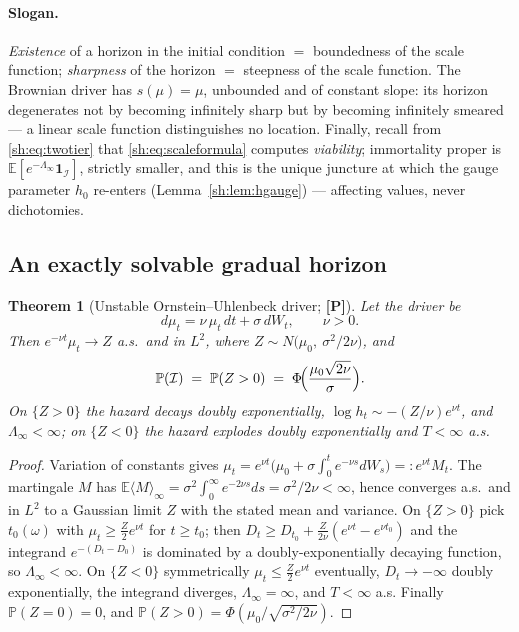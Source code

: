 \documentclass[11pt]{article}
\numberwithin{equation}{section}
\theoremstyle{plain}
\newtheorem{theorem}{Theorem}[section]
\theoremstyle{definition}
\theoremstyle{remark}
\newcommand{\E}{\mathbb{E}}
\newcommand{\PP}{\mathbb{P}}
\newcommand{\one}{\mathbf{1}}
\newcommand{\Imm}{\mathcal{I}}
\begin{document}
\paragraph{Slogan.}\label{sh:rem:slogan}
\emph{Existence} of a horizon in the initial condition
$=$ boundedness of the scale function;
\emph{sharpness} of the horizon $=$ steepness of the scale function.
The Brownian driver has $s(\mu)=\mu$, unbounded and of constant slope: its
horizon degenerates not by becoming infinitely sharp but by becoming
infinitely smeared --- a linear scale function distinguishes no location.
Finally, recall from \eqref{sh:eq:twotier} that
\eqref{sh:eq:scaleformula} computes \emph{viability}; immortality proper is
$\E[e^{-\Lambda_\infty}\one_\Imm]$, strictly smaller, and this is the
unique juncture at which the gauge parameter $h_0$ re-enters
(Lemma~\ref{sh:lem:hgauge}) --- affecting values, never dichotomies.

\subsection{An exactly solvable gradual horizon}\label{sh:subsub:solvable}

\begin{theorem}[Unstable Ornstein--Uhlenbeck driver; \textbf{[P]}]
\label{sh:thm:uou}
Let the driver be
\begin{equation}\label{sh:eq:uou}
d\mu_t=\nu\,\mu_t\,dt+\sigma\,dW_t,\qquad \nu>0 .
\end{equation}
Then $e^{-\nu t}\mu_t\to Z$ a.s.\ and in $L^2$, where
$Z\sim N\!\bigl(\mu_0,\ \sigma^2/2\nu\bigr)$, and
\begin{equation}\label{sh:eq:sigmoid}
\PP(\Imm)\;=\;\PP(Z>0)\;=\;\Phi\!\Bigl(\frac{\mu_0\sqrt{2\nu}}{\sigma}\Bigr).
\end{equation}
On $\{Z>0\}$ the hazard decays doubly exponentially,
$\log h_t\sim-(Z/\nu)e^{\nu t}$, and $\Lambda_\infty<\infty$; on
$\{Z<0\}$ the hazard explodes doubly exponentially and $T<\infty$ a.s.
\end{theorem}

\begin{proof}
Variation of constants gives
$\mu_t=e^{\nu t}\bigl(\mu_0+\sigma\int_0^te^{-\nu s}dW_s\bigr)
=:e^{\nu t}M_t$. The martingale $M$ has
$\E\langle M\rangle_\infty=\sigma^2\!\int_0^\infty e^{-2\nu s}ds
=\sigma^2/2\nu<\infty$, hence converges a.s.\ and in $L^2$ to a Gaussian
limit $Z$ with the stated mean and variance. On $\{Z>0\}$ pick
$t_0(\omega)$ with $\mu_t\ge\tfrac Z2e^{\nu t}$ for $t\ge t_0$; then
$D_t\ge D_{t_0}+\tfrac{Z}{2\nu}(e^{\nu t}-e^{\nu t_0})$ and the integrand
$e^{-(D_t-D_0)}$ is dominated by a doubly-exponentially decaying function,
so $\Lambda_\infty<\infty$. On $\{Z<0\}$ symmetrically
$\mu_t\le\tfrac Z2e^{\nu t}$ eventually, $D_t\to-\infty$ doubly
exponentially, the integrand diverges, $\Lambda_\infty=\infty$, and
$T<\infty$ a.s. Finally $\PP(Z=0)=0$, and
$\PP(Z>0)=\Phi(\mu_0/\sqrt{\sigma^2/2\nu})$.
\end{proof}
\end{document}
